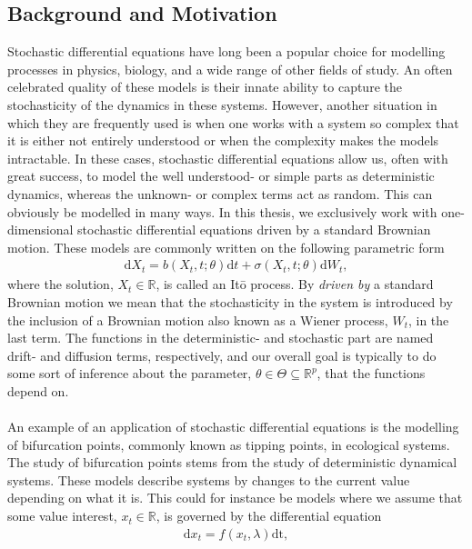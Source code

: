 \subsection{Background and Motivation}
Stochastic differential equations have long been a popular choice for modelling processes in physics, biology, and a wide range of other fields of study. An often celebrated quality of these models is their innate ability to capture the stochasticity of the dynamics in these systems. However, another situation in which they are frequently used is when one works with a system so complex that it is either not entirely understood or when the complexity makes the models intractable. In these cases, stochastic differential equations allow us, often with great success, to model the well understood- or simple parts as deterministic dynamics, whereas the unknown- or complex terms act as random. This can obviously be modelled in many ways. In this thesis, we exclusively work with one-dimensional stochastic differential equations driven by a standard Brownian motion. These models are commonly written on the following parametric form
\begin{align}
    \mathrm{d}X_t = b(X_t, t;\theta)\mathrm{d}t + \sigma\left(X_t, t; \theta\right)\mathrm{d}W_t,
\end{align}
where the solution, $X_t\in\mathbb{R}$, is called an Itō process. By \textit{driven by} a standard Brownian motion we mean that the stochasticity in the system is introduced by the inclusion of a Brownian motion also known as a Wiener process, $W_t$, in the last term. The functions in the deterministic- and stochastic part are named drift- and diffusion terms, respectively, and our overall goal is typically to do some sort of inference about the parameter, $\theta\in\Theta\subseteq\mathbb{R}^p$, that the functions depend on. \\\\
An example of an application of stochastic differential equations is the modelling of bifurcation points, commonly known as tipping points, in ecological systems. The study of bifurcation points stems from the study of deterministic dynamical systems. These models describe systems by changes to the current value depending on what it is. This could for instance be models where we assume that some value interest, $x_t\in\mathbb{R}$, is governed by the differential equation
\begin{align}
    \mathrm{d}x_t = f(x_t, \lambda)\mathrm{dt},
\end{align}

